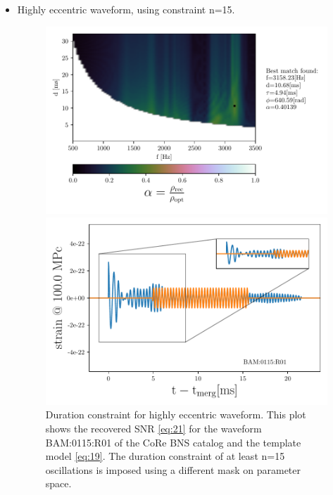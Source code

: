 \begin{itemize}[leftmargin=*]
\FloatBarrier


\item Highly eccentric waveform, using constraint n=15.

\begin{figure}[!htbp]
\begin{center}
\begin{minipage}[t]{0.5\linewidth}
\vspace{0pt}
\includegraphics[scale=0.6,trim={2mm 0 35mm 0},clip]{images/Data_analysis/results/2D_grid_15.pdf}
\end{minipage}%
\begin{minipage}[t]{0.5\linewidth}
\vspace{20pt}
\includegraphics[scale=0.45]{images/Data_analysis/results/2D_grid_16.pdf}
\end{minipage}
\captionsetup{width=0.8\textwidth}
\caption[Duration constraint for highly eccentric waveform]{Duration constraint for highly eccentric waveform. This plot shows the recovered SNR \ref{eq:21} for the waveform BAM:0115:R01 of the CoRe BNS catalog \cite{Dietrich:2018phi} and the template model \ref{eq:19}. The duration constraint of at least n=15 oscillations is imposed using a different mask on parameter space.}
\end{center}
\end{figure}

\FloatBarrier

\end{itemize}

